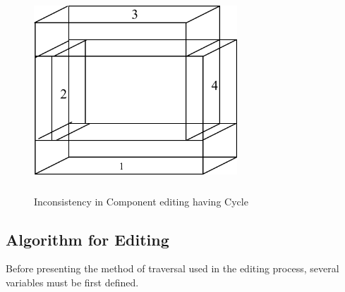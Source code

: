\begin{itemize}
        \begin{figure}[htbp]
	\hspace{4cm}
	\includegraphics[width=3.0in,height=3.0in]{CYLEDITB.pdf}
            \caption{Inconsistency in Component editing having Cycle}
            \label{cyleditb}
        \end{figure}
 

	\end{itemize}

	\subsection{Algorithm for Editing}

	Before presenting the method of traversal used in the editing process,
	several variables must be first defined.


